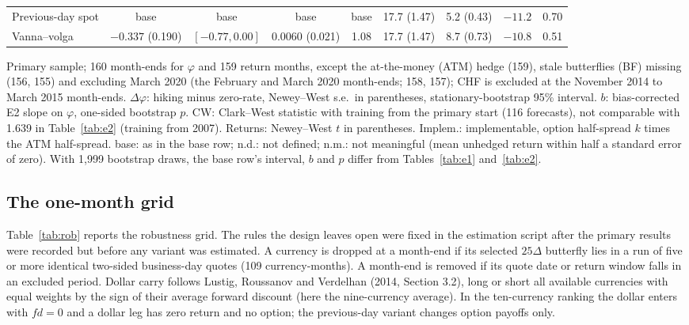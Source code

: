 \documentclass[11pt]{article}
\theoremstyle{result}
\newcommand{\fd}{\mathit{fd}}
\newcommand{\D}{\Delta}
\begin{document}
\begin{table}[t]
\begin{tabular}{lcccccccc}
Previous-day spot & base & base & base & base & 17.7 (1.47) & 5.2 (0.43) & $-11.2$ & 0.70 \\
Vanna--volga & $-0.337$ (0.190) & $[-0.77,0.00]$ & 0.0060 (0.021) & 1.08 & 17.7 (1.47) & 8.7 (0.73) & $-10.8$ & 0.51 \\
\bottomrule
\end{tabular}
\par\medskip
\begin{minipage}{0.97\linewidth}\footnotesize
Primary sample; 160 month-ends for $\varphi$ and 159 return months, except the at-the-money (ATM) hedge (159), stale butterflies (BF) missing (156, 155) and excluding March 2020 (the February and March 2020 month-ends; 158, 157); CHF is excluded at the November 2014 to March 2015 month-ends. $\D\varphi$: hiking minus zero-rate, Newey--West s.e.\ in parentheses, stationary-bootstrap 95\% interval. $b$: bias-corrected E2 slope on $\varphi$, one-sided bootstrap $p$. CW: Clark--West statistic with training from the primary start (116 forecasts), not comparable with 1.639 in Table~\ref{tab:e2} (training from 2007). Returns: Newey--West $t$ in parentheses. Implem.: implementable, option half-spread $k$ times the ATM half-spread. base: as in the base row; n.d.: not defined; n.m.: not meaningful (mean unhedged return within half a standard error of zero). With 1,999 bootstrap draws, the base row's interval, $b$ and $p$ differ from Tables~\ref{tab:e1} and~\ref{tab:e2}.
\end{minipage}
\end{table}

\subsection{The one-month grid}

Table~\ref{tab:rob} reports the robustness grid. The rules the design leaves open were fixed in the estimation script after the primary results were recorded but before any variant was estimated. A currency is dropped at a month-end if its selected $25\D$ butterfly lies in a run of five or more identical two-sided business-day quotes (109 currency-months). A month-end is removed if its quote date or return window falls in an excluded period. Dollar carry follows Lustig, Roussanov and Verdelhan (2014, Section 3.2), long or short all available currencies with equal weights by the sign of their average forward discount (here the nine-currency average). In the ten-currency ranking the dollar enters with $\fd=0$ and a dollar leg has zero return and no option; the previous-day variant changes option payoffs only.
\end{document}
